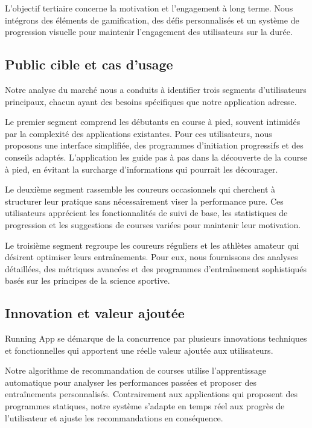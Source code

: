 L'objectif tertiaire concerne la motivation et l'engagement à long terme. Nous intégrons des éléments de gamification, des défis personnalisés et un système de progression visuelle pour maintenir l'engagement des utilisateurs sur la durée.

\subsection{Public cible et cas d'usage}

Notre analyse du marché nous a conduits à identifier trois segments d'utilisateurs principaux, chacun ayant des besoins spécifiques que notre application adresse.

Le premier segment comprend les débutants en course à pied, souvent intimidés par la complexité des applications existantes. Pour ces utilisateurs, nous proposons une interface simplifiée, des programmes d'initiation progressifs et des conseils adaptés. L'application les guide pas à pas dans la découverte de la course à pied, en évitant la surcharge d'informations qui pourrait les décourager.

Le deuxième segment rassemble les coureurs occasionnels qui cherchent à structurer leur pratique sans nécessairement viser la performance pure. Ces utilisateurs apprécient les fonctionnalités de suivi de base, les statistiques de progression et les suggestions de courses variées pour maintenir leur motivation.

Le troisième segment regroupe les coureurs réguliers et les athlètes amateur qui désirent optimiser leurs entraînements. Pour eux, nous fournissons des analyses détaillées, des métriques avancées et des programmes d'entraînement sophistiqués basés sur les principes de la science sportive.

\subsection{Innovation et valeur ajoutée}

Running App se démarque de la concurrence par plusieurs innovations techniques et fonctionnelles qui apportent une réelle valeur ajoutée aux utilisateurs.

Notre algorithme de recommandation de courses utilise l'apprentissage automatique pour analyser les performances passées et proposer des entraînements personnalisés. Contrairement aux applications qui proposent des programmes statiques, notre système s'adapte en temps réel aux progrès de l'utilisateur et ajuste les recommandations en conséquence.

